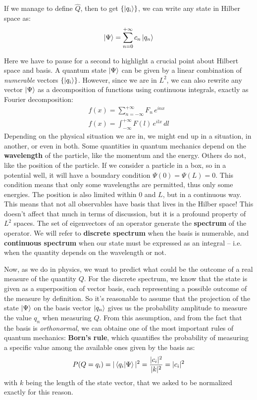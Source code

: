 \documentclass[12pt,a4paper]{article}
\begin{document}
If we manage to define $\hat{Q}$, then to get $\{\ket{q_i}\}$, we can write any state
in Hilber space as:
\begin{equation}
    \ket{\Psi} = \sum_{n=0}^{+\infty}c_n \ket{q_n}
\end{equation}

\vspace{16pt}
Here we have to pause for a second to highlight a crucial point about Hilbert space
and basis. A quantum state $\ket{\Psi}$ can be given by a linear combination of
\textit{numerable} vectors $\{\ket{q_i}\}$. However, since we are in $L^2$, we can
also rewrite any vector $\ket{\Psi}$ as a decomposition of functions using continuous
integrals, exactly as Fourier decomposition:
\begin{align*}
    f(x) = \sum_{n = -\infty}^{+\infty}F_n \, e^{inx}\\[2pt]
    f(x) = \int_{-\infty}^{+\infty} F(l) \, e^{ilx} \, dl
\end{align*}
Depending on the physical situation we are in, we might end up in a situation, in
another, or even in both. Some quantities in quantum mechanics depend on the
\textbf{wavelength} of the particle, like the momentum and the energy. Others do not,
like the position of the particle. If we consider a particle in a box, so in a
potential well, it will have a boundary condition $\Psi(0)=\Psi(L)=0$. This condition
means that only some wavelengths are permitted, thus only some energies. The position
is also limited within $0$ and $L$, but in a continuous way. This means that not all
observables have basis that lives in the Hilber space! This doesn't affect that
much in terms of discussion, but it is a profound property of $L^2$ spaces.
The set of eigenvectors of an operator generate the \textbf{spectrum} of the operator.
We will refer to \textbf{discrete spectrum} when the basis is numerable,
and \textbf{continuous spectrum} when our state must be expressed as an integral --
i.e. when the quantity depends on the wavelength or not.
\vspace{16pt}

Now, as we do in physics, we want to predict what could be the outcome of a real
measure of the quantity $Q$. For the discrete spectrum, we know that the state is
given as a superposition of vector basis, each representing a possible outcome
of the measure by definition. So it's reasonable to assume that the projection
of the state $\ket{\Psi}$ on the basis vector $\ket{q_n}$ gives us the
probability amplitude to measure the value $q_n$ when measuring $Q$. From this assumption,
and from the fact that the basis is \textit{orthonormal}, we can obtaine one of the most
important rules of quantum mechanics: \textbf{Born's rule}, which quantifies the
probability of measuring a specific value among the available ones given by
the basis as:
\begin{equation}
    P(Q=q_i) = |\braket{q_i}{\Psi}|^2 = \dfrac{|c_i|^2}{|k|^2} = |c_i|^2
\end{equation}
with $k$ being the length of the state vector, that we asked to be normalized exactly
for this reason.
\end{document}
